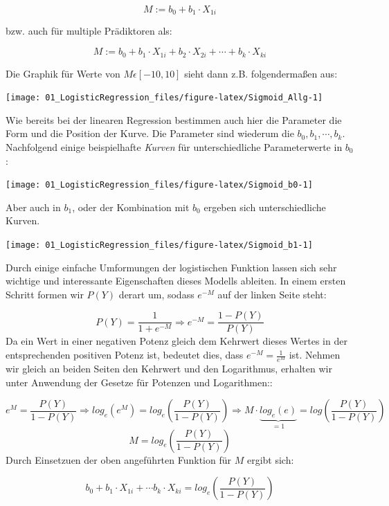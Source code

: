 \documentclass[
]{article}
\begin{document}
\[M := b_0 + b_1 \cdot X_{1i}\]

bzw. auch für multiple Prädiktoren als:

\[M := b_0 + b_1 \cdot X_{1i} + b_2 \cdot X_{2i} + \cdots + b_k \cdot X_{ki}\]

Die Graphik für Werte von \(M \epsilon [-10, 10]\) sieht dann z.B. folgendermaßen aus:

\begin{center}\texttt{[image: 01\_LogisticRegression\_files/figure-latex/Sigmoid\_Allg-1]} \end{center}

Wie bereits bei der linearen Regression bestimmen auch hier die Parameter die Form und die Position der Kurve. Die Parameter sind wiederum die \(b_0, b_1, \cdots, b_k\). Nachfolgend einige beispielhafte \emph{Kurven} für unterschiedliche Parameterwerte in \(b_0\):

\begin{center}\texttt{[image: 01\_LogisticRegression\_files/figure-latex/Sigmoid\_b0-1]} \end{center}

Aber auch in \(b_1\), oder der Kombination mit \(b_0\) ergeben sich unterschiedliche Kurven.

\begin{center}\texttt{[image: 01\_LogisticRegression\_files/figure-latex/Sigmoid\_b1-1]} \end{center}

Durch einige einfache Umformungen der logistischen Funktion lassen sich sehr wichtige und interessante Eigenschaften dieses Modells ableiten. In einem ersten Schritt formen wir \(P(Y)\) derart um, sodass \(e^{-M}\) auf der linken Seite steht:

\[P(Y) = \frac{1}{1 + e^{-M}} \Rightarrow e^{-M} = \frac{1-P(Y)}{P(Y)}\]
Da ein Wert in einer negativen Potenz gleich dem Kehrwert dieses Wertes in der entsprechenden positiven Potenz ist, bedeutet dies, dass \(e^{-M} = \frac{1}{e^M}\) ist. Nehmen wir gleich an beiden Seiten den Kehrwert und den Logarithmus, erhalten wir unter Anwendung der Gesetze für Potenzen und Logarithmen::

\[e^{M} = \frac{P(Y)}{1-P(Y)} \Rightarrow log_e(e^{M}) = log_e\left(\frac{P(Y)}{1-P(Y)} \right) \Rightarrow M \cdot \underbrace{log_e(e)}_{=1} = log\left(\frac{P(Y)}{1-P(Y)} \right)\]
\[M = log_e\left(\frac{P(Y)}{1-P(Y)} \right)\]
Durch Einsetzuen der oben angeführten Funktion für \(M\) ergibt sich:

\[b_0 + b_1 \cdot X_{1i} + \cdots b_k \cdot X_{ki} = log_e\left(\frac{P(Y)}{1-P(Y)} \right)\]
\end{document}
